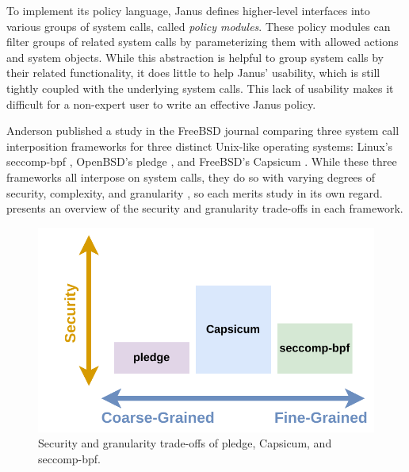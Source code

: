 \documentclass[dvipsnames, 12pt]{article}
\begin{document}
To implement its policy language, Janus defines higher-level interfaces into
various groups of system calls, called \textit{policy modules}. These policy
modules can filter groups of related system calls by parameterizing them with
allowed actions and system objects. While this abstraction is helpful to group
system calls by their related functionality, it does little to help Janus'
usability, which is still tightly coupled with the underlying system calls. This
lack of usability makes it difficult for a non-expert user to write an effective
Janus policy.


Anderson published a study in the FreeBSD journal \cite{anderson2017_comparison}
comparing three system call interposition frameworks for three distinct
Unix-like operating systems: Linux's seccomp-bpf \cite{seccomp_bpf,
drewry2012_seccomp_bpf}, OpenBSD's pledge \cite{pledge}, and FreeBSD's Capsicum
\cite{capsicum, watson2010_capsicum}. While these three frameworks all interpose
on system calls, they do so with varying degrees of security, complexity, and
granularity \cite{anderson2017_comparison}, so each merits study in its own
regard.   presents an overview of the security
and granularity trade-offs in each framework.

\begin{figure}[htpb]
    \centering
    \includegraphics[width=0.8\linewidth]{figs/systemcall-interposition.pdf}
    \caption{Security and granularity trade-offs of pledge,
    Capsicum, and seccomp-bpf.}%
    \label{fig:syscall_interposition}
\end{figure}
\end{document}
